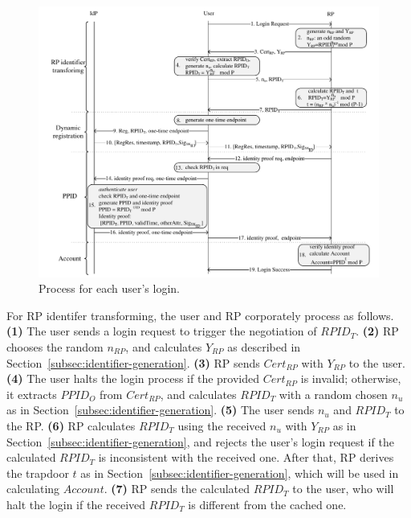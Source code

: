 \begin{figure}
  \centering
  \includegraphics[width=\linewidth]{fig/process.pdf}
  \caption{Process for each user's login.}
  \label{fig:process}
\end{figure}

For RP identifer transforming, the user and RP corporately process as follows. \textbf{(1)} The user sends a login request to trigger the negotiation of $RPID_T$. \textbf{(2)} RP chooses the random $n_{RP}$, and calculates $Y_{RP}$ as described in Section~\ref{subsec:identifier-generation}. \textbf{(3)} RP sends $Cert_{RP}$ with $Y_{RP}$ to the user.  \textbf{(4)} The user halts the login process if the provided $Cert_{RP}$ is invalid; otherwise, it extracts $PPID_O$ from $Cert_{RP}$, and calculates $RPID_T$ with a random chosen $n_u$ as in Section~\ref{subsec:identifier-generation}. \textbf{(5)} The user sends $n_u$ and $RPID_T$ to the RP. \textbf{(6)} RP calculates $RPID_T$ using the received $n_u$ with $Y_{RP}$ as in Section~\ref{subsec:identifier-generation}, and rejects the user's login request if the calculated $RPID_T$ is inconsistent with the received one. After that, RP derives the trapdoor $t$ as in Section~\ref{subsec:identifier-generation}, which will be used in calculating $Account$. \textbf{(7)} RP sends the calculated $RPID_T$ to the user, who will halt the login if the received $RPID_T$ is different from the cached one.

